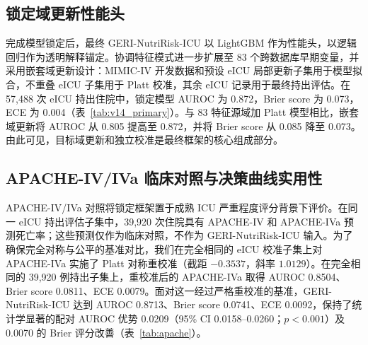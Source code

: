 \documentclass[11pt]{ctexart}
\begin{document}
\subsection{锁定域更新性能头}
完成模型锁定后，最终 GERI-NutriRisk-ICU 以 LightGBM 作为性能头，以逻辑回归作为透明解释锚定。协调特征模式进一步扩展至 83 个跨数据库早期变量，并采用嵌套域更新设计：MIMIC-IV 开发数据和预设 eICU 局部更新子集用于模型拟合，不重叠 eICU 子集用于 Platt 校准，其余 eICU 记录用于最终持出评估。在 57,488 次 eICU 持出住院中，锁定模型 AUROC 为 0.872，Brier score 为 0.073，ECE 为 0.004（表~\ref{tab:v14_primary}）。与 83 特征源域加 Platt 模型相比，嵌套域更新将 AUROC 从 0.805 提高至 0.872，并将 Brier score 从 0.085 降至 0.073。由此可见，目标域更新和独立校准是最终框架的核心组成部分。

\begin{table}[htbp]
\centering
\caption{锁定 GERI-NutriRisk-ICU V14 特征集和嵌套域更新模型在 eICU 持出集中的表现。粗体表示该列显示结果中的最优值；Brier 和 ECE 越低越好。}
\label{tab:v14_primary}
\noindent{}
\end{table}

\subsection{APACHE-IV/IVa 临床对照与决策曲线实用性}
APACHE-IV/IVa 对照将锁定框架置于成熟 ICU 严重程度评分背景下评价。在同一 eICU 持出评估子集中，39,920 次住院具有 APACHE-IV 和 APACHE-IVa 预测死亡率；这些预测仅作为临床对照，不作为 GERI-NutriRisk-ICU 输入。为了确保完全对称与公平的基准对比，我们在完全相同的 eICU 校准子集上对 APACHE-IVa 实施了 Platt 对称重校准（截距 $-0.3537$，斜率 $1.0129$）。在完全相同的 39,920 例持出子集上，重校准后的 APACHE-IVa 取得 AUROC 0.8504、Brier score 0.0811、ECE 0.0079。面对这一经过严格重校准的基准，GERI-NutriRisk-ICU 达到 AUROC 0.8713、Brier score 0.0741、ECE 0.0092，保持了统计学显著的配对 AUROC 优势 0.0209（95\% CI 0.0158--0.0260；$p<0.001$）及 0.0070 的 Brier 评分改善（表~\ref{tab:apache}）。
\end{document}
